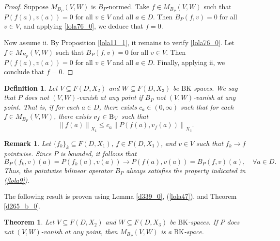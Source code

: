 \documentclass[14pt, a4paper]{article}  %
\newcounter{property}
\providecommand{\pare}[1]{\left( #1\right) }
\providecommand{\norm}[1]{\left\lVert#1\right\rVert}
\newcommand{\BK}{\text{BK}}
\newcommand{\B}{\textup{B}}
\newtheorem{theorem}{Theorem}[section]
\newtheorem{remark}{Remark}[section]
\newtheorem{definition}{Definition}[section]
\begin{document}
\begin{proof}
	Suppose $M_{B_{P}}(V, W)$ is $B_{P}$-normed. Take $f \in M_{B_{P}}(V, W)$ such that $P(f(a), v(a)) = 0$ for all $v \in V$ and all $a \in D$. Then $B_{P}(f, v) = 0$ for all $v \in V$, and applying \ref{lola76_0}, we deduce that $f = 0$.
	
	Now assume ii. By Proposition \ref{lola11_1}, it remains to verify \ref{lola76_0}. Let $f \in M_{B_{P}}(V, W)$ such that $B_{P}(f, v) = 0$ for all $v \in V$. Then $P(f(a), v(a)) = 0$ for all $v \in V$ and all $a \in D$. Finally, applying ii, we conclude that $f = 0$.
\end{proof} 


\begin{definition}
	Let $V \subseteq F(D, X_{2})$ and $W \subseteq F(D, X_{3})$ be $\BK$-spaces. We say that $P$ does not  $\pare{V,W}$-vanish at any point  if $B_{P}$ not  $\pare{V,W}$-vanish at any point. That is,  if for each $a\in D$, there exists $c_{a}\in (0,\infty)$ such that for each $f\in M_{B_{P}}\pare{V,W}$, there exists $v_{f}\in \B_{V}$  such that
	\begin{equation} 
		\norm{f\pare{a}}_{X_{1}}\leq c_{a} \norm{P\pare{f\pare{a},v_{f}\pare{a}}}_{X_{3}}.
	\end{equation}
\end{definition}

 
\begin{remark}
	Let $\{f_{k}\}_{k} \subseteq F(D, X_{1})$, $f \in F(D, X_{1})$, and $v \in V$ such that $f_{k} \to f$ pointwise. Since $P$ is bounded, it follows that 
	\begin{equation}\label{lola47}
		B_{P}(f_{k}, v)(a) = P(f_{k}(a), v(a)) \to P(f(a), v(a)) = B_{P}(f, v)(a), \quad \forall a \in D.
	\end{equation}
	Thus, the pointwise bilinear operator $B_{P}$ always satisfies the property indicated in (\ref{lola9}). 
\end{remark}		



The following result is proven using Lemma \ref{d339_0}, (\ref{lola47}), and Theorem \ref{d265_b_0}.
\begin{theorem}\label{lola28_3}\label{lola35_2}
	Let $V \subseteq F(D, X_{2})$ and $W \subseteq F(D, X_{3})$ be $\BK$-spaces. If $P$ does not $\pare{V,W}$-vanish at any point, then $M_{B_{P}}(V, W)$ is a $\BK$-space.
\end{theorem}

 
\end{document}
